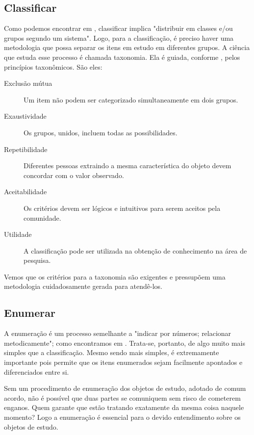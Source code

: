 		\subsection{Classificar}
			\label{subsec:classificar}
			Como podemos encontrar em \cite{Holanda1975}, classificar implica "distribuir em classes e/ou grupos
			segundo um sistema". Logo, para a classificação, é preciso haver uma metodologia que possa
			separar os itens em estudo em diferentes grupos. A ciência que estuda esse processo
			é chamada taxonomia. Ela é guiada, conforme \cite{Gregio2005_1}, pelos princípios taxonômicos.
			São eles:
			\begin{description}
				\item[Exclusão mútua]
					Um item não podem ser categorizado simultaneamente em dois grupos.
				\item[Exaustividade]
					Os grupos, unidos, incluem todas as possibilidades.
				\item[Repetibilidade]
					Diferentes pessoas extraindo a mesma característica do objeto devem concordar com
					o valor observado.
				\item[Aceitabilidade]
					Os critérios devem ser lógicos e intuitivos para serem aceitos pela comunidade.
				\item[Utilidade]
					A classificação pode ser utilizada na obtenção de conhecimento na área de pesquisa.
			\end{description}

			
			Vemos que os critérios para a taxonomia são exigentes e pressupõem uma metodologia
			cuidadosamente gerada para atendê-los. 

		\subsection{Enumerar}
			A enumeração é um processo semelhante a 
			"indicar por números; relacionar metodicamente"; como encontramos
			em \cite{Holanda1975}.
			Trata-se, portanto, de algo muito mais simples que a classificação.
			Mesmo sendo mais simples, é extremamente importante pois permite
			que os itens enumerados sejam facilmente apontados e diferenciados entre si.
			
			
			Sem um procedimento de enumeração dos objetos de estudo, adotado de comum acordo,
			não é possível que duas partes se comuniquem sem risco de cometerem enganos. 
			Quem garante que estão tratando exatamente da mesma coisa naquele momento?
			Logo a enumeração é essencial para o devido entendimento sobre os objetos
			de estudo.

